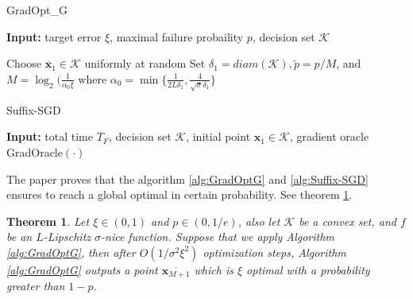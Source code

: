 \begin{algorithm}
\caption{GradOpt_G}
\label{alg:GradOptG}
{\bfseries Input:} target error $\xi$, maximal failure probaility $p$, decision set $\mathcal{K}$
\begin{algorithmic}[1]
\State Choose $\overline{\mathbf{x}}_1 \in \mathcal{K}$ uniformly at random
\State Set $\delta_1 = diam(\mathcal{K}), \tilde{p} = p/M$, and $M = \log_2(\frac{1}{\alpha_0\xi}$ where $\alpha_0=\min\big\{\frac{1}{2L\delta_1}, \frac{4}{\sqrt{\sigma}\delta_1}\big\}$  
\EndFor
\State {}
\end{algorithmic}
\end{algorithm}

\begin{algorithm}
\caption{Suffix-SGD}
\label{alg:Suffix-SGD}
{\bfseries Input:} total time $T_F$, decision set $\mathcal{K}$, initial point $\mathbf{x}_1 \in \mathcal{K}$, gradient oracle GradOracle$(\cdot)$
\begin{algorithmic}[1]
\EndFor
\State {} 
\end{algorithmic}
\end{algorithm}

The paper proves that the algorithm \ref{alg:GradOptG} and \ref{alg:Suffix-SGD} ensures to reach a global optimal in certain probability. See theorem \ref{theorem:GradOptG}.
\newtheorem{theorem:GradOptG}{Theorem}
\begin{theorem:GradOptG}
\label{theorem:GradOptG}
Let $\xi \in (0,1)$ and $p \in (0, 1/e)$, also let $\mathcal{K}$ be a convex set, and $f$ be an $L$-Lipschitz $\sigma$-nice function. Suppose that we apply Algorithm \ref{alg:GradOptG}, then after $O(1/\sigma^2\xi^2)$ optimization steps, Algorithm \ref{alg:GradOptG} outputs a point $\overline{\mathbf{x}_{M+1}}$ which is $\xi$ optimal with a probability greater than $1-p$.
\end{theorem:GradOptG}

